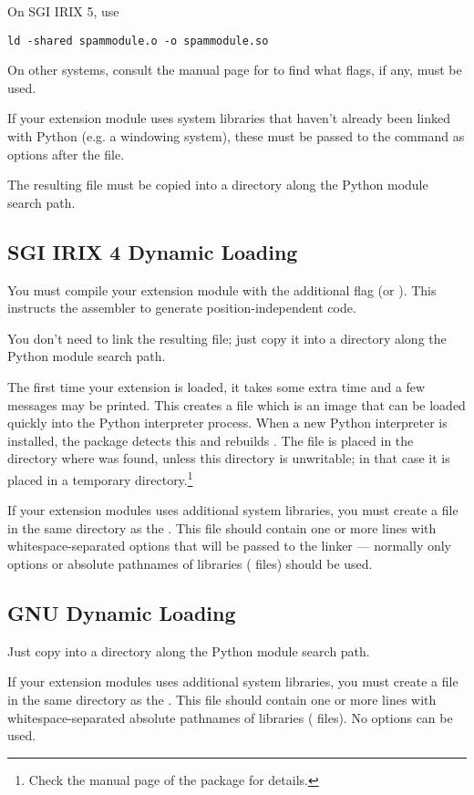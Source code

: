 \documentclass{manual}
\begin{document}
On SGI IRIX 5, use
\begin{verbatim}
ld -shared spammodule.o -o spammodule.so
\end{verbatim}

On other systems, consult the manual page for  to find
what flags, if any, must be used.

If your extension module uses system libraries that haven't already
been linked with Python (e.g. a windowing system), these must be
passed to the  command as  options after the
 file.

The resulting file  must be copied into a directory
along the Python module search path.


\subsection{SGI IRIX 4 Dynamic Loading}
\label{irixLinking}

 You must compile your extension module with the
additional \C{} flag  (or ).  This instructs the
assembler to generate position-independent code.

You don't need to link the resulting  file; just
copy it into a directory along the Python module search path.%

The first time your extension is loaded, it takes some extra time and
a few messages may be printed.  This creates a file
 which is an image that can be loaded quickly into
the Python interpreter process.  When a new Python interpreter is
installed, the  package detects this and rebuilds
.  The file  is placed in the
directory where  was found, unless this directory is
unwritable; in that case it is placed in a temporary
directory.\footnote{Check the manual page of the  package for
details.}

If your extension modules uses additional system libraries, you must
create a file  in the same directory as the
.  This file should contain one or more lines with
whitespace-separated options that will be passed to the linker ---
normally only  options or absolute pathnames of libraries
( files) should be used.


\subsection{GNU Dynamic Loading}
\label{gnuLinking}

Just copy  into a directory along the Python module
search path.%

If your extension modules uses additional system libraries, you must
create a file  in the same directory as the
.  This file should contain one or more lines with
whitespace-separated absolute pathnames of libraries (
files).  No  options can be used.
\end{document}
